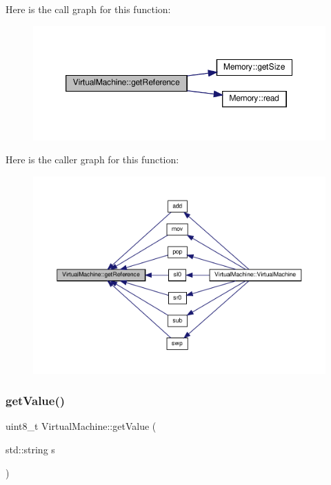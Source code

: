Here is the call graph for this function\+:
\nopagebreak
\begin{figure}[H]
\begin{center}
\leavevmode
\includegraphics[width=350pt]{class_virtual_machine_a0f55b241f2e14264dfaec5449d136a50_cgraph}
\end{center}
\end{figure}
Here is the caller graph for this function\+:
\nopagebreak
\begin{figure}[H]
\begin{center}
\leavevmode
\includegraphics[width=350pt]{class_virtual_machine_a0f55b241f2e14264dfaec5449d136a50_icgraph}
\end{center}
\end{figure}
\mbox{\label{class_virtual_machine_a09bdaea77003f19912e0f101faefa26f}} 
\subsubsection{\texorpdfstring{get\+Value()}{getValue()}}
{\footnotesize\ttfamily uint8\+\_\+t Virtual\+Machine\+::get\+Value (\begin{DoxyParamCaption}\item[{std\+::string}]{s }\end{DoxyParamCaption})}

